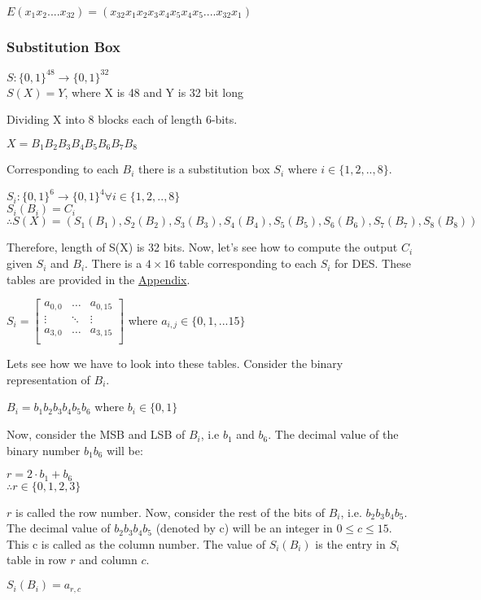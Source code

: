 \documentclass[11pt]{article}
\begin{document}
\begin{center}
    $E(x_1x_2....x_{32}) = (x_{32}x_1x_2x_3x_4x_5x_4x_5....x_{32}x_1)$
\end{center}

\subsubsection{Substitution Box}
\begin{center}
    $S: \{0, 1\}^{48} \rightarrow \{0, 1\}^{32}$\\
    $S(X) = Y$,  where X is 48 and Y is 32 bit long
\end{center}
Dividing X into 8 blocks each of length 6-bits.
\begin{center}
    $X = B_1B_2B_3B_4B_5B_6B_7B_8$\\
\end{center}
Corresponding to each $B_i$ there is a substitution box $S_i$ where $i \in \{1,2,..,8\}$.
\begin{center}
    $S_i: \{0, 1\}^6 \rightarrow \{0, 1\}^4  \forall i \in \{1,2,..,8\}$\\
    $S_i(B_i) = C_i$\\
    $\therefore S(X) = (S_1(B_1), S_2(B_2), S_3(B_3), S_4(B_4), S_5(B_5), S_6(B_6), S_7(B_7), S_8(B_8))$ 
\end{center}
Therefore, length of S(X) is 32 bits. Now, let's see how to compute the output $C_i$ given $S_i$ and $B_i$. There is a $4 \times 16$ table corresponding to each $S_i$ for DES. These tables are provided in the \hyperref[appendix]{Appendix}.\\
\begin{center}
    $ S_i = 
    \begin{bmatrix}
        a_{0,0} & \dots & a_{0,15}\\
        \vdots & \ddots & \vdots\\
        a_{3,0} & \dots & a_{3,15}\\
    \end{bmatrix}$ 
    where $a_{i,j} \in \{0, 1,...15\}$
\end{center}

Lets see how we have to look into these tables. Consider the binary representation of $B_i$.
\begin{center}
    $B_i = b_1b_2b_3b_4b_5b_6$ where $b_i \in \{0, 1\}$
\end{center}
Now, consider the MSB and LSB of $B_i$, i.e $b_1$ and $b_6$. The decimal value of the binary number $b_1b_6$ will be:
\begin{center}
    $r = 2 \cdot b_1 + b_6$\\
    $\therefore r \in \{0, 1, 2, 3\}$ 
\end{center}
$r$ is called the row number. Now, consider the rest of the bits of $B_i$, i.e. $b_2b_3b_4b_5$. The decimal value of $b_2b_3b_4b_5$ (denoted by c) will be an integer in $0 \leq c \leq 15$. This c is called as the column number. The value of $S_i(B_i)$ is the entry in $S_i$ table in row $r$ and column $c$.
\begin{center}
    $S_i(B_i) = a_{r,c}$
\end{center}
\end{document}

